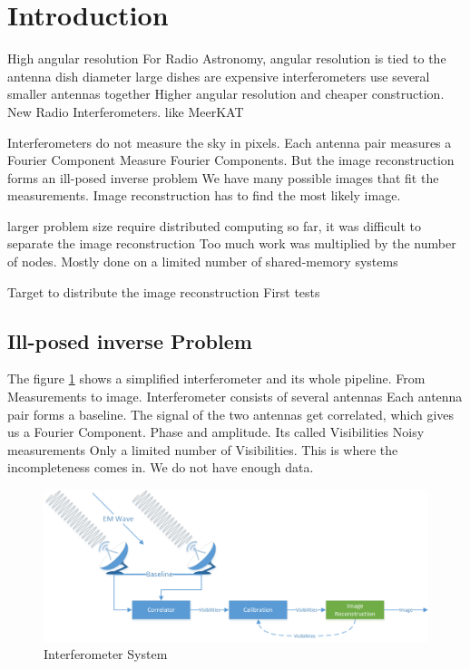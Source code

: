 \section{Introduction}
High angular resolution
For Radio Astronomy, angular resolution is tied to the antenna dish diameter
large dishes are expensive
interferometers use several smaller antennas together
Higher angular resolution and cheaper construction.
New Radio Interferometers. like MeerKAT

Interferometers do not measure the sky in pixels. Each antenna pair measures a Fourier Component
Measure Fourier Components.
But the image reconstruction forms an ill-posed inverse problem
We have many possible images that fit the measurements.
Image reconstruction has to find the most likely image.

larger problem size require distributed computing
so far, it was difficult to separate the image reconstruction
Too much work was multiplied by the number of nodes.
Mostly done on a limited number of shared-memory systems

Target to distribute the image reconstruction
First tests


\subsection{Ill-posed inverse Problem}
The figure \ref{intro:system} shows a simplified interferometer and its whole pipeline. From Measurements to image.
Interferometer consists of several antennas
Each antenna pair forms a baseline. The signal of the two antennas get correlated, which gives us a Fourier Component. Phase and amplitude.
Its called Visibilities
Noisy measurements
Only a limited number of Visibilities. This is where the incompleteness comes in. We do not have enough data.

\begin{figure}[h]
	\centering
	\includegraphics[width=0.80\linewidth]{./chapters/01.intro/system.png}
	\caption{Interferometer System}
	\label{intro:system}
\end{figure}

